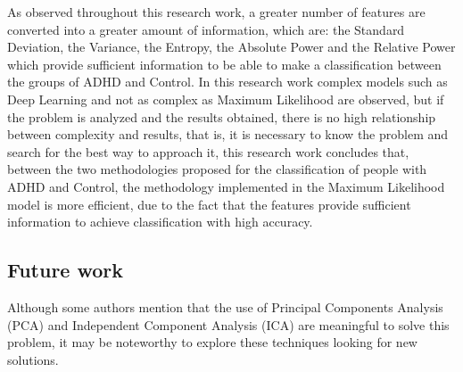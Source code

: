 \documentclass[letterpaper,12pt,openright,oneside]{article}
\begin{document}
As observed throughout this research work, a greater number of features are converted into a greater amount of information, which are: the Standard Deviation, the Variance, the Entropy, the Absolute Power and the Relative Power which provide sufficient information to be able to make a classification between the groups of ADHD and Control. In this research work complex models such as Deep Learning and not as complex as Maximum Likelihood are observed, but if the problem is analyzed and the results obtained, there is no high relationship between complexity and results, that is, it is necessary to know the problem and search for the best way to approach it, this research work concludes that, between the two methodologies proposed for the classification of people with ADHD and Control, the methodology implemented in the Maximum Likelihood model is more efficient, due to the fact that the features provide sufficient information to achieve classification with high accuracy.




\subsection{Future work}
Although some authors mention that the use of Principal Components Analysis (PCA) and Independent Component Analysis (ICA) are meaningful to solve this problem, it may be noteworthy to explore these techniques looking for new solutions.






\pagebreak



 		
\end{document}
